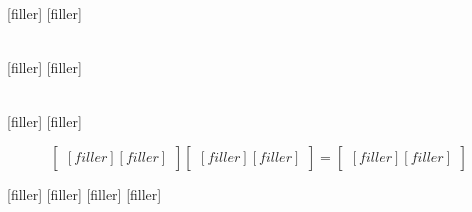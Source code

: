  

[filler]
[filler]



\begin{align*} 
[filler]
[filler]
\end{align*}

[filler]
[filler]

\begin{align*} 
[filler]
[filler]
\end{align*}

[filler]
[filler]


$$
\begin{bmatrix} 
[filler]
[filler]
\end {bmatrix} 
\begin{bmatrix}
[filler]
[filler]
\end{bmatrix}
=
\begin{bmatrix}
[filler]
[filler]
\end{bmatrix}
$$


[filler]
[filler]
[filler]
[filler]


%    

%   
